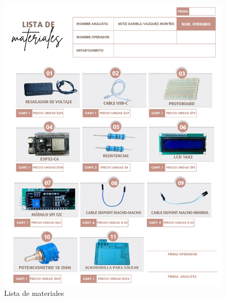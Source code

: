     \begin{figure}[H]
        \centering
        \includegraphics[trim = {1mm 1mm 1mm 1mm},clip,scale=0.2]{34/img/listaMateriales.png}
        \caption{Lista de materiales}
        \label{fig:enter-label1}
    \end{figure}
